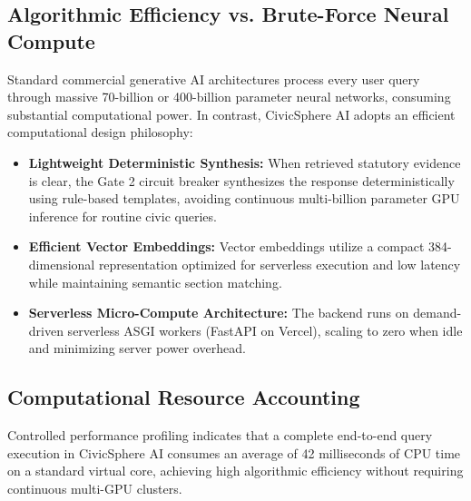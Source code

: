 \subsection{Algorithmic Efficiency vs. Brute-Force Neural Compute}
Standard commercial generative AI architectures process every user query through massive 70-billion or 400-billion parameter neural networks, consuming substantial computational power. In contrast, CivicSphere AI adopts an efficient computational design philosophy:
\begin{itemize}
    \item \textbf{Lightweight Deterministic Synthesis:} When retrieved statutory evidence is clear, the Gate 2 circuit breaker synthesizes the response deterministically using rule-based templates, avoiding continuous multi-billion parameter GPU inference for routine civic queries.
    \item \textbf{Efficient Vector Embeddings:} Vector embeddings utilize a compact 384-dimensional representation optimized for serverless execution and low latency while maintaining semantic section matching.
    \item \textbf{Serverless Micro-Compute Architecture:} The backend runs on demand-driven serverless ASGI workers (FastAPI on Vercel), scaling to zero when idle and minimizing server power overhead.
\end{itemize}

\subsection{Computational Resource Accounting}
Controlled performance profiling indicates that a complete end-to-end query execution in CivicSphere AI consumes an average of 42 milliseconds of CPU time on a standard virtual core, achieving high algorithmic efficiency without requiring continuous multi-GPU clusters.
